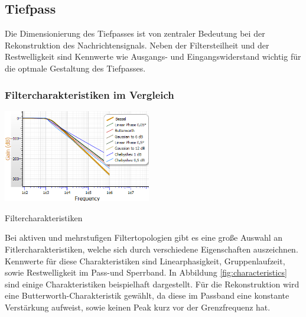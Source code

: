 \newpage
\subsection{Tiefpass}
Die Dimensionierung des Tiefpasses ist von zentraler Bedeutung bei der Rekonstruktion des Nachrichtensignals. Neben der Filtersteilheit und der Restwelligkeit sind Kennwerte wie Ausgangs- und Eingangswiderstand wichtig für die optmale Gestaltung des Tiefpasses.
\subsubsection{Filtercharakteristiken im Vergleich} 
\begin{floatingfigure}[r]{7cm}
	\centering
	\includegraphics[width=6.45cm]{gfx/simRx/characteristics.png}
	\caption{Filtercharakteristiken}
\label{fig:characteristics}
\end{floatingfigure}
\noindent
Bei aktiven und mehrstufigen Filtertopologien gibt es eine große Auswahl an Fitlercharakteristiken, welche sich durch verschiedene Eigenschaften auszeichnen. Kennwerte für diese Charakteristiken sind Linearphasigkeit, Gruppenlaufzeit, sowie Restwelligkeit im Pass-und Sperrband. In Abbildung \ref{fig:characteristics} sind einige Charakteristiken beispielhaft dargestellt. Für die Rekonstruktion wird eine Butterworth-Charakteristik gewählt, da diese im Passband eine konstante Verstärkung aufweist, sowie keinen Peak kurz vor der Grenzfrequenz hat.\\

